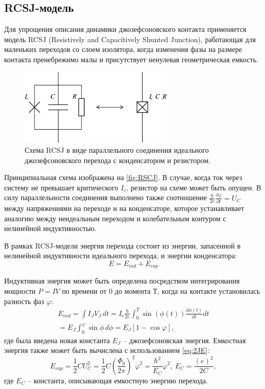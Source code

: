 \documentclass[12pt, twoside]{report}
\numberwithin{equation}{section}
\numberwithin{figure}{section}
\begin{document}
\subsection{RCSJ-модель}
Для упрощения описания динамики джозефсоновского контакта применяется модель RCSJ (Resistively and Capacitively Shunted Junction), работающая для маленьких переходов со слоем изолятора, когда изменения фазы на размере контакта пренебрежимо малы и присутствует ненулевая геометрическая емкость. 
\begin{figure}[h]
\centering
\includegraphics[width=0.65\textwidth]{Pictures/RCSJ.png}
\caption{Схема RCSJ в виде параллельного соединения идеального джозефсоновского перехода с конденсатором и резистором.}
\label{fig:RSCJ}
\end{figure}

Принципиальная схема изображена на \autoref{fig:RSCJ}. В случае, когда ток через систему не превышает критического $I_c$, резистор на схеме может быть опущен. В силу параллельности соединения выполнено также соотношение $\frac{\hbar}{2e}\frac{\partial\varphi}{\partial t} = U_C$ между напряжениями на переходе и на конденсаторе, которое устанавливает аналогию между неидеальным переходом и колебательным контуром с нелинейной индуктивностью.

В рамках RCSJ-модели энергия перехода состоит из энергии, запасенной в нелинейной индуктивности идеального перехода, и энергии конденсатора:
\begin{equation}
E = E_{ind}+E_{cap}  \label{eq:JJenrj1}
\end{equation}

Индуктивная энергия может быть определена посредством интегрирования мощности $P = IV$ по времени от 0 до момента Т, когда на контакте установилась разность фаз $\varphi$:
\begin{equation}
\begin{gathered}
E_{ind} = \int I_JV_J\, dt = I_c \frac{\hbar}{2e}\int_0^T \sin(\phi(t))\frac{d\phi(t)}{dt}dt  \\ 
= E_J \int_0^\varphi \sin\phi\, d\phi = E_J [1-\cos\varphi],
\end{gathered}
\end{equation}
где была введена новая константа $E_J$ -- джозефсоновская энергия. Емкостная энергия также может быть вычислена с использованием \eqref{eq:2JE}:
\begin{equation}
E_{cap} = \frac{1}{2}C U_C^2 = \frac{1}{2} C \left(\frac{\Phi_0}{2\pi}\right)^2 \dot \varphi^2 = 
\frac{\hbar^2}{E_C} \dot \varphi^2,\ E_C = \frac{(e)^2}{2C},
\label{eq:JJenrj2}
\end{equation}
где $E_C$ -- константа, описывающая емкостную энергию перехода.
\end{document}
